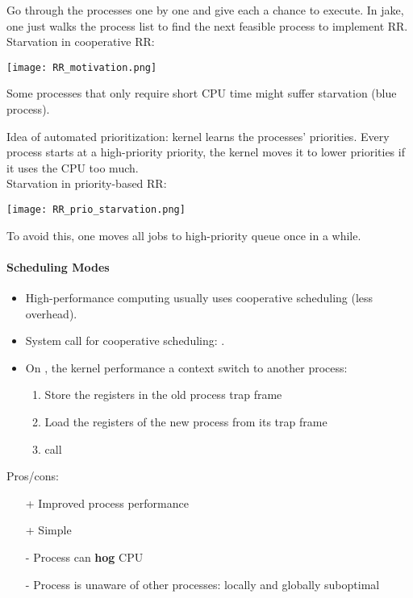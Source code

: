 Go through the processes one by one and give each a chance to execute. In jake, one just walks the process list to find the next feasible process to implement RR.\\
Starvation in cooperative RR:
\begin{center}
    \texttt{[image: RR\_motivation.png]}
\end{center}
Some processes that only require short CPU time might suffer starvation (blue process).

\newpar{}

Idea of automated prioritization: kernel learns the processes' priorities. Every process starts at a high-priority priority, the kernel moves it to lower priorities if it uses the CPU too much.\\
Starvation in priority-based RR:
\begin{center}
    \texttt{[image: RR\_prio\_starvation.png]}
\end{center}
To avoid this, one moves all jobs to high-priority queue once in a while.

\paragraph{Scheduling Modes}

\newpar{}

\begin{itemize}
    \item High-performance computing usually uses cooperative scheduling (less overhead).
    \item System call for cooperative scheduling: .
    \item On , the kernel performance a context switch to another process: %
          \begin{enumerate}
              \item Store the registers in the old process trap frame
              \item Load the registers of the new process from its trap frame
              \item call 
          \end{enumerate}
\end{itemize}
Pros/cons:
\begin{itemize}
    \item[+] Improved process performance
    \item[+] Simple
    \item[-] Process can \textbf{hog} CPU
    \item[-] Process is unaware of other processes: locally and globally suboptimal
\end{itemize}

